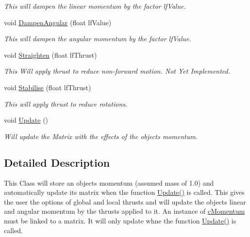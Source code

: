 \begin{DoxyCompactItemize}
\begin{DoxyCompactList}\small\item\em This will dampen the linear momentum by the factor lfValue. \end{DoxyCompactList}\item 
\hypertarget{classc_momentum_a761435c725896ef0f60452a68fdddaf4}{
void \hyperlink{classc_momentum_a761435c725896ef0f60452a68fdddaf4}{DampenAngular} (float lfValue)}
\label{classc_momentum_a761435c725896ef0f60452a68fdddaf4}

\begin{DoxyCompactList}\small\item\em This will dampen the angular momentum by the factor lfValue. \end{DoxyCompactList}\item 
\hypertarget{classc_momentum_a9f6e219b6b7de80f9ed48f8424a54db5}{
void \hyperlink{classc_momentum_a9f6e219b6b7de80f9ed48f8424a54db5}{Straighten} (float lfThrust)}
\label{classc_momentum_a9f6e219b6b7de80f9ed48f8424a54db5}

\begin{DoxyCompactList}\small\item\em This Will apply thrust to reduce non-\/forward motion. Not Yet Implemented. \end{DoxyCompactList}\item 
\hypertarget{classc_momentum_a1f20db0caa8b8e903193287988b3f27e}{
void \hyperlink{classc_momentum_a1f20db0caa8b8e903193287988b3f27e}{Stabilise} (float lfThrust)}
\label{classc_momentum_a1f20db0caa8b8e903193287988b3f27e}

\begin{DoxyCompactList}\small\item\em This will apply thrust to reduce rotations. \end{DoxyCompactList}\item 
\hypertarget{classc_momentum_ae860280e817e7afef71222afd0b12ec8}{
void \hyperlink{classc_momentum_ae860280e817e7afef71222afd0b12ec8}{Update} ()}
\label{classc_momentum_ae860280e817e7afef71222afd0b12ec8}

\begin{DoxyCompactList}\small\item\em Will update the Matrix with the effects of the objects momentum. \end{DoxyCompactList}\end{DoxyCompactItemize}


\subsection{Detailed Description}
This Class will store an objects momentum (assumed mass of 1.0) and automatically update its matrix when the function \hyperlink{classc_momentum_ae860280e817e7afef71222afd0b12ec8}{Update()} is called. This gives the user the options of global and local thrusts and will update the objects linear and angular momentum by the thrusts applied to it. An instance of \hyperlink{classc_momentum}{cMomentum} must be linked to a matrix. It will only update whne the function \hyperlink{classc_momentum_ae860280e817e7afef71222afd0b12ec8}{Update()} is called. 